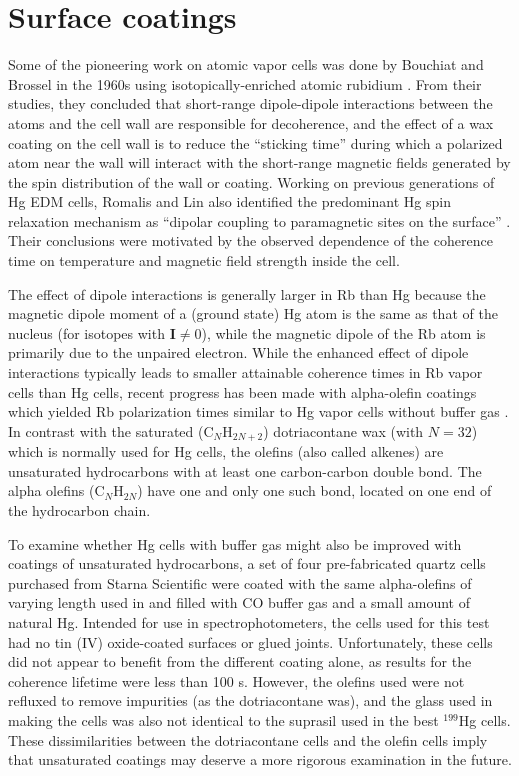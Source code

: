 \documentclass [10pt, twoside] {uwthesis}[2012/04/02]
\begin{document}
\section{Surface coatings}
Some of the pioneering work on atomic vapor cells was done by Bouchiat and Brossel in the 1960s using isotopically-enriched atomic rubidium \cite{1966_Bouchiat_Brossel_Rb_relaxation}. From their studies, they concluded that short-range dipole-dipole interactions between the atoms and the cell wall are responsible for decoherence, and the effect of a wax coating on the cell wall is to reduce the ``sticking time'' during which a polarized atom near the wall will interact with the short-range magnetic fields generated by the spin distribution of the wall or coating. Working on previous generations of Hg EDM cells, Romalis and Lin also identified the predominant Hg spin relaxation mechanism as ``dipolar coupling to paramagnetic sites on the surface'' \cite{2004_Romalis_Lin_Hg_relaxation}. Their conclusions were motivated by the observed dependence of the coherence time on temperature and magnetic field strength inside the cell.

The effect of dipole interactions is generally larger in Rb than Hg because the magnetic dipole moment of a (ground state) Hg atom is the same as that of the nucleus (for isotopes with $\mathbf{I} \neq 0$), while the magnetic dipole of the Rb atom is primarily due to the unpaired electron. While the enhanced effect of dipole interactions typically leads to smaller attainable coherence times in Rb vapor cells than Hg cells, recent progress has been made with alpha-olefin coatings \cite{2010_Budker_long_Rb_coherence_alpha_olefins} which yielded Rb polarization times similar to Hg vapor cells without buffer gas \cite{2013_PSI_Hg_antirelaxation_coatings}. In contrast with the saturated (C$_{N}$H$_{2N+2}$) dotriacontane wax (with $N=32$) which is normally used for Hg cells, the olefins (also called alkenes) are unsaturated hydrocarbons with at least one carbon-carbon double bond. The alpha olefins (C$_{N}$H$_{2N}$) have one and only one such bond, located on one end of the hydrocarbon chain. 

To examine whether Hg cells with buffer gas might also be improved with coatings of unsaturated hydrocarbons, a set of four pre-fabricated quartz cells purchased from Starna Scientific were coated with the same alpha-olefins of varying length used in \cite{2010_Budker_long_Rb_coherence_alpha_olefins} and filled with CO buffer gas and a small amount of natural Hg. Intended for use in spectrophotometers, the cells used for this test had no tin (IV) oxide-coated surfaces or glued joints. Unfortunately, these cells did not appear to benefit from the different coating alone, as results for the coherence lifetime were less than 100 s. However, the olefins used were not refluxed to remove impurities (as the dotriacontane was), and the glass used in making the cells was also not identical to the suprasil used in the best $^{199}$Hg cells. These dissimilarities between the dotriacontane cells and the olefin cells imply that unsaturated coatings may deserve a more rigorous examination in the future.
\end{document}
